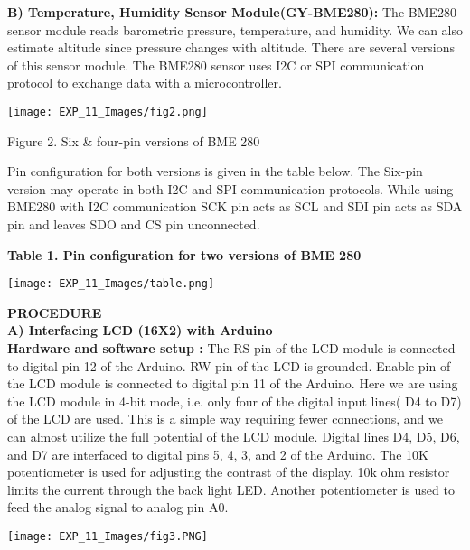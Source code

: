 \documentclass[12pt,a4paper]{article}
\begin{document}
\begin{justify}
\noindent \textbf{B) Temperature, Humidity Sensor Module(GY-BME280):  }
The BME280 sensor module reads barometric pressure, temperature, and humidity. We can also estimate altitude since pressure changes with altitude. There are several versions of this sensor module. The BME280 sensor uses I2C or SPI communication protocol to exchange data with a microcontroller.

\begin{center} 
\texttt{[image: EXP\_11\_Images/fig2.png]}
\end{center}
\begin{center} {Figure 2. Six & four-pin versions of BME 280}\end{center}



\noindent Pin configuration for both versions is given in the table below. The Six-pin version may operate in both I2C and SPI communication protocols. While using BME280 with I2C communication SCK pin acts as SCL and SDI pin acts as SDA pin and leaves SDO and CS pin unconnected. \\
\vspace{20mm}
\begin{center} \textbf{Table 1. Pin configuration for two versions of  BME 280}\end{center}
\vspace{-5mm}
\begin{center} 
\texttt{[image: EXP\_11\_Images/table.png]}
\end{center}

\noindent \textbf{\large PROCEDURE}\\[3pt]
\textbf{A)	Interfacing LCD (16X2) with Arduino}\\[3pt]
\textbf{Hardware and software setup :} The RS pin of the LCD module is connected to digital pin 12 of the Arduino. RW pin of the LCD is grounded. Enable pin of the LCD module is connected to digital pin 11 of the Arduino. Here we are using the LCD module in 4-bit mode, i.e. only four of the digital input lines( D4 to D7) of the LCD are used. This is a simple way requiring fewer connections, and we can almost utilize the full potential of the LCD module. Digital lines D4, D5, D6, and D7 are interfaced to digital pins 5, 4, 3, and 2 of the Arduino. The 10K potentiometer is used for adjusting the contrast of the display. 10k ohm resistor limits the current through the back light LED. Another potentiometer is used to feed the analog signal to analog pin A0.


\begin{center} 
\texttt{[image: EXP\_11\_Images/fig3.PNG]}
\end{center}


\end{justify}
\end{document}
